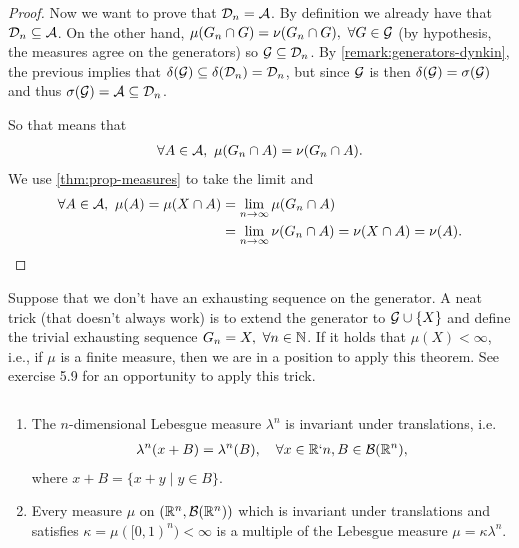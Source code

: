 \begin{proof}
	Now we want to prove that $\mathcal{D}_n = \mathcal{A}$. By definition we already have that $\mathcal{D}_n \subseteq \mathcal{A}$. On the other hand, $\mu(G_n \cap G) = \nu(G_n \cap G),\ \forall G \in \mathcal{G}$ (by hypothesis, the measures agree on the generators) so $\mathcal{G} \subseteq \mathcal{D}_n$. By \autoref{remark:generators-dynkin}, the previous implies that $\delta(\mathcal{G}) \subseteq \delta(\mathcal{D}_n) = \mathcal{D}_n$, but since $\mathcal{G}$ is \istable then $\delta(\mathcal{G}) = \sigma(\mathcal{G})$ and thus $\sigma(\mathcal{G}) = \mathcal{A} \subseteq \mathcal{D}_n$.
	
	So that means that
	\begin{align*}
		\forall A \in \mathcal{A},\ \mu(G_n \cap A) = \nu(G_n \cap A).
	\end{align*}
	We use \autoref{thm:prop-measures} to take the limit and
	\begin{align*}
		\forall A \in \mathcal{A},\ \mu(A)
		= \mu(X \cap A)
		&= \lim_{n\to\infty} \mu(G_n \cap A)\\
		&= \lim_{n\to\infty} \nu(G_n \cap A)
		= \nu(X \cap A)
		= \nu(A).
	\end{align*}
\end{proof}

Suppose that we don't have an exhausting sequence on the generator. A neat trick (that doesn't always work) is to extend the generator to $\mathcal{G} \cup \{X\}$ and define the trivial exhausting sequence $G_n = X,\ \forall n \in \mathbb{N}$. If it holds that $\mu(X) < \infty$, i.e., if $\mu$ is a finite measure, then we are in a position to apply this theorem. See exercise 5.9 for an opportunity to apply this trick.

\begin{lem}$ $\newline
	\begin{enumerate}
		\item The $n$-dimensional Lebesgue measure $\lambda^n$ is invariant under translations, i.e.
		\begin{align*}
			\lambda^n(x + B) = \lambda^n(B),\quad \forall x \in \mathbb{R}`n, B \in \mathcal{B}(\mathbb{R}^n),
		\end{align*}
		where $x + B = \{x + y \mid y \in B\}$.
		
		\item Every measure $\mu$ on $(\mathbb{R}^n, \mathcal{B}(\mathbb{R}^n))$ which is invariant under translations and satisfies $\kappa = \mu([0,1)^n) < \infty$ is a multiple of the Lebesgue measure $\mu = \kappa \lambda^n$.
	\end{enumerate}
\end{lem}

